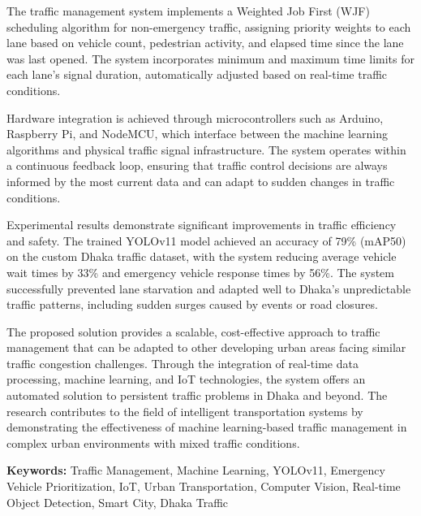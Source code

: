 The traffic management system implements a Weighted Job First (WJF) scheduling algorithm for non-emergency traffic, assigning priority weights to each lane based on vehicle count, pedestrian activity, and elapsed time since the lane was last opened. The system incorporates minimum and maximum time limits for each lane's signal duration, automatically adjusted based on real-time traffic conditions.

Hardware integration is achieved through microcontrollers such as Arduino, Raspberry Pi, and NodeMCU, which interface between the machine learning algorithms and physical traffic signal infrastructure. The system operates within a continuous feedback loop, ensuring that traffic control decisions are always informed by the most current data and can adapt to sudden changes in traffic conditions.

Experimental results demonstrate significant improvements in traffic efficiency and safety. The trained YOLOv11 model achieved an accuracy of 79\% (mAP50) on the custom Dhaka traffic dataset, with the system reducing average vehicle wait times by 33\% and emergency vehicle response times by 56\%. The system successfully prevented lane starvation and adapted well to Dhaka's unpredictable traffic patterns, including sudden surges caused by events or road closures.

The proposed solution provides a scalable, cost-effective approach to traffic management that can be adapted to other developing urban areas facing similar traffic congestion challenges. Through the integration of real-time data processing, machine learning, and IoT technologies, the system offers an automated solution to persistent traffic problems in Dhaka and beyond. The research contributes to the field of intelligent transportation systems by demonstrating the effectiveness of machine learning-based traffic management in complex urban environments with mixed traffic conditions.

\textbf{Keywords:} Traffic Management, Machine Learning, YOLOv11, Emergency Vehicle Prioritization, IoT, Urban Transportation, Computer Vision, Real-time Object Detection, Smart City, Dhaka Traffic

\newpage 